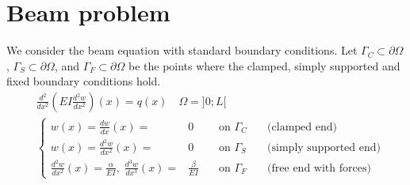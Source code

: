 %
\section{Beam problem}\label{sec:}
%
\newcommand{\primitive}[3]{\left[{#1}\right]_{#2}^{#3}}
%
We consider the beam equation with standard boundary conditions. 
Let $\Gamma_C\subset\partial\Omega$, $\Gamma_S\subset\partial\Omega$, and $\Gamma_F\subset\partial\Omega$ be the points where the clamped, simply supported and fixed boundary conditions hold.
%
\begin{equation}\label{eq:beam_strong}
\begin{aligned}
&\frac{d^2}{dx^2} (EI \frac{d^2 w}{dx^2})(x) = q(x)\quad \Omega=]0;L[\\
%
&\left\{
\begin{aligned}
w(x) = \frac{d w}{dx}(x) =& 0 &\quad\mbox{on $\Gamma_C$}&\quad\mbox{(clamped end)}\\
w(x) = \frac{d^2 w}{dx^2}(x) =& 0 &\quad\mbox{on $\Gamma_S$} &\quad\mbox{(simply supported end)}\\
\frac{d^2 w}{dx^2}(x) = \frac{\alpha}{EI},\; \frac{d^3 w}{dx^3}(x) =& \frac{\beta}{EI} &\quad\mbox{on $\Gamma_F$}&\quad\mbox{(free end with forces)}
\end{aligned}
\right.
%
\end{aligned}
\end{equation}
%
%
%
